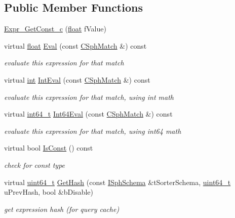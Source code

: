 \subsection*{Public Member Functions}
\begin{DoxyCompactItemize}
\item 
\hyperlink{structExpr__GetConst__c_a740faf9c46a300a61fa6c82e21cb1f68}{Expr\-\_\-\-Get\-Const\-\_\-c} (\hyperlink{sphinxexpr_8cpp_a0e0d0739f7035f18f949c2db2c6759ec}{float} f\-Value)
\item 
virtual \hyperlink{sphinxexpr_8cpp_a0e0d0739f7035f18f949c2db2c6759ec}{float} \hyperlink{structExpr__GetConst__c_aa57ccea7c8cd1a9503a452109c1b1d19}{Eval} (const \hyperlink{classCSphMatch}{C\-Sph\-Match} \&) const 
\begin{DoxyCompactList}\small\item\em evaluate this expression for that match \end{DoxyCompactList}\item 
virtual \hyperlink{sphinxexpr_8cpp_a4a26e8f9cb8b736e0c4cbf4d16de985e}{int} \hyperlink{structExpr__GetConst__c_a0d5c38c7ee17758d184a434ae63eb8e9}{Int\-Eval} (const \hyperlink{classCSphMatch}{C\-Sph\-Match} \&) const 
\begin{DoxyCompactList}\small\item\em evaluate this expression for that match, using int math \end{DoxyCompactList}\item 
virtual \hyperlink{sphinxstd_8h_a996e72f71b11a5bb8b3b7b6936b1516d}{int64\-\_\-t} \hyperlink{structExpr__GetConst__c_aa03eb010b65e3c05e2a308674e986309}{Int64\-Eval} (const \hyperlink{classCSphMatch}{C\-Sph\-Match} \&) const 
\begin{DoxyCompactList}\small\item\em evaluate this expression for that match, using int64 math \end{DoxyCompactList}\item 
virtual bool \hyperlink{structExpr__GetConst__c_a964fb5aa08698e0765c750d5a674cdad}{Is\-Const} () const 
\begin{DoxyCompactList}\small\item\em check for const type \end{DoxyCompactList}\item 
virtual \hyperlink{sphinxstd_8h_aaa5d1cd013383c889537491c3cfd9aad}{uint64\-\_\-t} \hyperlink{structExpr__GetConst__c_afdb95832e452b09768747b9a16c510e5}{Get\-Hash} (const \hyperlink{classISphSchema}{I\-Sph\-Schema} \&t\-Sorter\-Schema, \hyperlink{sphinxstd_8h_aaa5d1cd013383c889537491c3cfd9aad}{uint64\-\_\-t} u\-Prev\-Hash, bool \&b\-Disable)
\begin{DoxyCompactList}\small\item\em get expression hash (for query cache) \end{DoxyCompactList}\end{DoxyCompactItemize}

